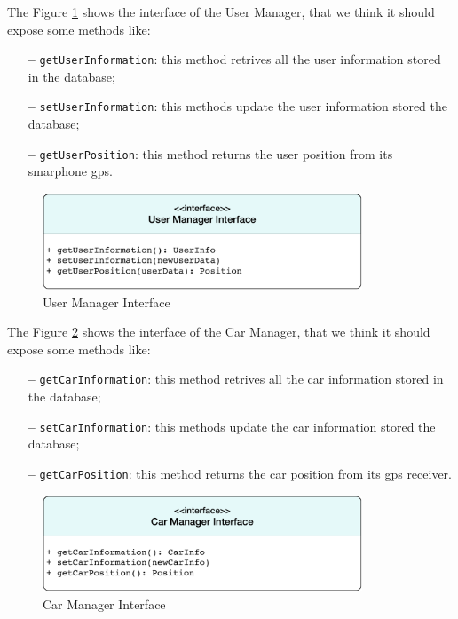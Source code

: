 \newline
The Figure \ref{fig:user} shows the interface of the User Manager, that we think it should expose some methods like:

\begin{itemize}
\item[\textbf{--}] \texttt{getUserInformation}: this method retrives all the user information stored in the database;
\item[\textbf{--}] \texttt{setUserInformation}: this methods update the user  information stored the database;
\item[\textbf{--}] \texttt{getUserPosition}: this method returns the user position from its smarphone \acs{gps}.
\end{itemize}

\begin{figure}[htbp]
\centering
\vspace{72pt}
\includegraphics[width=0.85\textwidth]{Images/UserManager.pdf}
\vspace{10pt}
\caption{User Manager Interface}
\label{fig:user}
\end{figure}
\clearpage

\newline
The Figure \ref{fig:car} shows the interface of the Car Manager, that we think it should expose some methods like:

\begin{itemize}
\item[\textbf{--}] \texttt{getCarInformation}: this method retrives all the car information stored in the database;
\item[\textbf{--}] \texttt{setCarInformation}: this methods update the car information stored the database;
\item[\textbf{--}] \texttt{getCarPosition}: this method returns the car position from its \acs{gps} receiver.
\end{itemize}

\begin{figure}[htbp]
\centering
\vspace{72pt}
\includegraphics[width=0.85\textwidth]{Images/CarManager.pdf}
\vspace{10pt}
\caption{Car Manager Interface}
\label{fig:car}
\end{figure}
\clearpage

